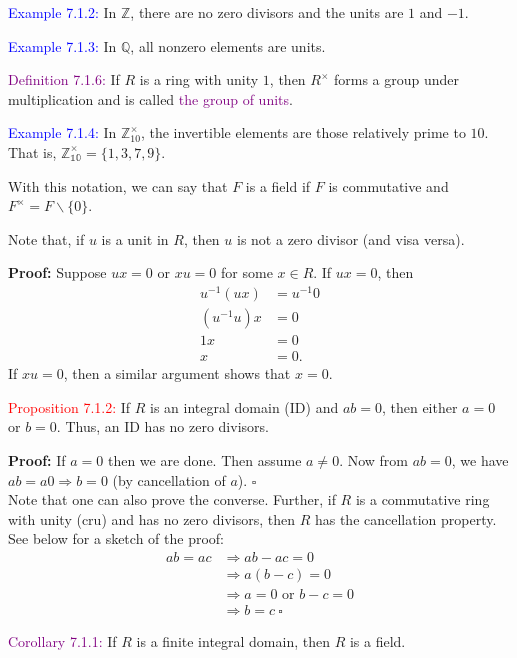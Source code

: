 \documentclass{article}
\begin{document}
\textcolor{blue}{Example 7.1.2:} In $\mathbb{Z}$, there are no zero divisors and the units are $1$ and $-1$.

\textcolor{blue}{Example 7.1.3:} In $\mathbb{Q}$, all nonzero elements are units.

\textcolor{purple}{Definition 7.1.6:} If $R$ is a ring with unity $1$, then $R^{\times}$ forms a group under multiplication and is called 
\textcolor{purple}{the group of units}.

\textcolor{blue}{Example 7.1.4:} In $\mathbb{Z}^{\times}_{10}$, the invertible elements are those relatively prime to $10$. That is, 
$\mathbb{Z^{\times}_{10}} = \{1,3,7,9\}$.

With this notation, we can say that $F$ is a field if $F$ is commutative and $F^{\times} = F \backslash \{0\}$. 

Note that, if $u$ is a unit in $R$, then $u$ is not a zero divisor (and visa versa).

\textbf{Proof:} Suppose $ux = 0$ or $xu = 0$ for some $x \in R$. If $ux = 0$, then
\begin{align*}
    u^{-1}(ux) &= u^{-1}0 \\
    (u^{-1}u)x &= 0 \\
    1x &= 0 \\
    x &= 0.
\end{align*}
If $xu = 0$, then a similar argument shows that $x = 0$.

\textcolor{red}{Proposition 7.1.2:} If $R$ is an integral domain (ID) and $ab=0$, then either $a = 0$ or $b = 0$. Thus, an ID has no zero 
divisors.

\textbf{Proof:} If $a = 0$ then we are done. Then assume $a \neq 0$. Now from $ab = 0$, we have $ab = a0 \Longrightarrow b = 0$ (by 
cancellation of $a$). $\square$ \\
Note that one can also prove the converse. Further, if $R$ is a commutative ring with unity (cru) and has no zero divisors, then $R$ has 
the cancellation property. See below for a sketch of the proof:
\begin{align*}
    ab = ac &\Longrightarrow ab-ac=0 \\
    &\Longrightarrow a(b-c) = 0 \\
    &\Longrightarrow a = 0 \text{ or } b -c=0 \\
    &\Longrightarrow b = c \ \square 
\end{align*}

\textcolor{purple}{Corollary 7.1.1:} If $R$ is a finite integral domain, then $R$ is a field.
\end{document}
